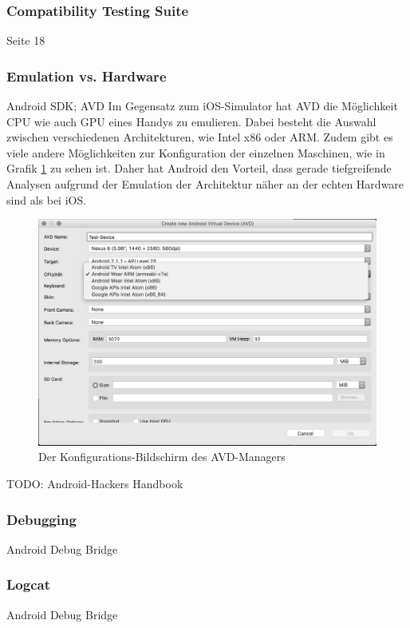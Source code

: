 			\subsubsection{Compatibility Testing Suite}
			\cite{Drake2014} Seite 18
			
			\subsubsection{Emulation vs. Hardware}
			Android SDK; AVD
			Im Gegensatz zum iOS-Simulator hat AVD die Möglichkeit CPU wie auch GPU eines Handys zu emulieren. Dabei besteht die Auswahl zwischen verschiedenen Architekturen, wie Intel x86 oder ARM. Zudem gibt es viele andere Möglichkeiten zur Konfiguration der einzelnen Maschinen, wie in Grafik \ref{fig:VergleichAVDConfig} zu sehen ist. Daher hat Android den Vorteil, dass gerade tiefgreifende Analysen aufgrund der Emulation der Architektur näher an der echten Hardware sind als bei iOS.
			
			\begin{figure}[htbp]
				\centering
				\includegraphics[width=\textwidth]{bilder/pentest_mobile_anwendungen/vergleich_aktuelle_situation/20170215_AVD-Config-Screen.png}
				\caption{Der Konfigurations-Bildschirm des AVD-Managers}
				\label{fig:VergleichAVDConfig}
			\end{figure}
			
			TODO: Android-Hackers Handbook
			
			\subsubsection{Debugging}	
			
			Android Debug Bridge\cite{androidDebugBridge}
			
			\subsubsection{Logcat}	
			Android Debug Bridge\cite{androidDebugBridge}